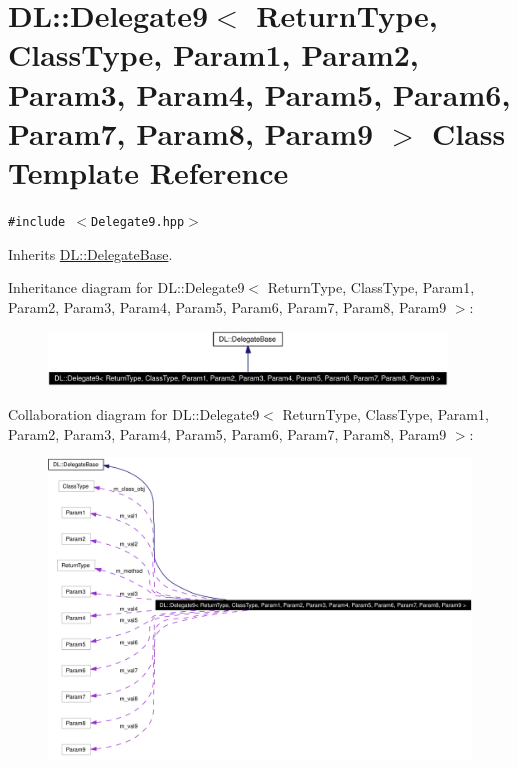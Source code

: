 \hypertarget{classDL_1_1Delegate9}{
\section{DL::Delegate9$<$ Return\-Type, Class\-Type, Param1, Param2, Param3, Param4, Param5, Param6, Param7, Param8, Param9 $>$ Class Template Reference}
\label{classDL_1_1Delegate9}
}
{\tt \#include $<$Delegate9.hpp$>$}

Inherits \hyperlink{classDL_1_1DelegateBase}{DL::Delegate\-Base}.

Inheritance diagram for DL::Delegate9$<$ Return\-Type, Class\-Type, Param1, Param2, Param3, Param4, Param5, Param6, Param7, Param8, Param9 $>$:\begin{figure}[H]
\begin{center}
\leavevmode
\includegraphics[width=300pt]{classDL_1_1Delegate9__inherit__graph}
\end{center}
\end{figure}
Collaboration diagram for DL::Delegate9$<$ Return\-Type, Class\-Type, Param1, Param2, Param3, Param4, Param5, Param6, Param7, Param8, Param9 $>$:\begin{figure}[H]
\begin{center}
\leavevmode
\includegraphics[width=395pt]{classDL_1_1Delegate9__coll__graph}
\end{center}
\end{figure}
